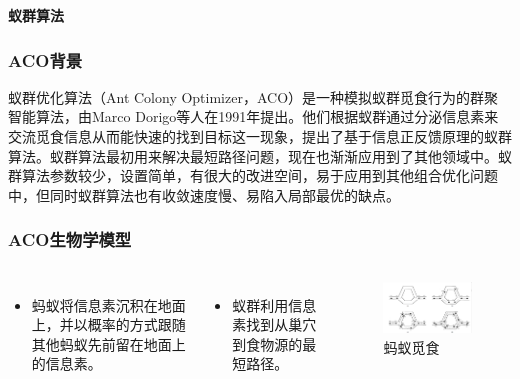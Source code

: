 
\begin{frame}
\newcommand{\song}{\setCJKfamilyfont{song}}
\newcommand{\xiaoer}{\fontsize{18pt}{18pt}\selectfont}
	\begin{center}
	{\song\xiaoer\textbf{蚁群算法}}
	\end{center}
\end{frame}


\begin{frame}
	\frametitle{ACO背景}
	蚁群优化算法（Ant Colony Optimizer，ACO）是一种模拟蚁群觅食行为的群聚智能算法，由Marco Dorigo等人在1991年提出。他们根据蚁群通过分泌信息素来交流觅食信息从而能快速的找到目标这一现象，提出了基于信息正反馈原理的蚁群算法。蚁群算法最初用来解决最短路径问题，现在也渐渐应用到了其他领域中。蚁群算法参数较少，设置简单，有很大的改进空间，易于应用到其他组合优化问题中，但同时蚁群算法也有收敛速度慢、易陷入局部最优的缺点。
\end{frame}


\begin{frame}
	\frametitle{ACO生物学模型}
	\begin{columns}
			\begin{itemize}
				\item{蚂蚁将信息素沉积在地面上，并以概率的方式跟随其他蚂蚁先前留在地面上的信息素。}
			\end{itemize}
			\begin{itemize}
				\item{蚁群利用信息素找到从巢穴到食物源的最短路径。}
			\end{itemize}		
			\begin{figure}
				\centering
				\includegraphics[width=8cm]{pic/ant1.png}
				\caption{蚂蚁觅食}
		\end{figure}
	\end{columns}	
\end{frame}


